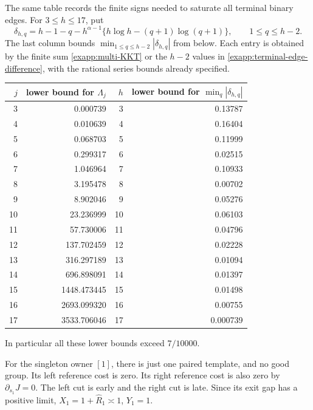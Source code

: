 The same table records the finite signs needed to saturate all
terminal binary edges.  For \(3\le h\le17\), put
\begin{equation}
 \delta_{h,q}=h-1-q-
 h^{\alpha-1}\{h\log h-(q+1)\log(q+1)\},
 \qquad 1\le q\le h-2.
 \label{exapp:terminal-edge-difference}
\end{equation}
The last column bounds \(\min_{1\le q\le h-2}|\delta_{h,q}|\)
from below.  Each entry is obtained by the finite sum
\eqref{exapp:multi-KKT} or the \(h-2\) values in
\eqref{exapp:terminal-edge-difference}, with the rational series
bounds already specified.
\begin{center}
\begin{tabular}{rr|rr}
\(j\)&lower bound for \(\Lambda_j\)&\(h\)&lower bound for
\(\min_q|\delta_{h,q}|\)\\ \hline
3&0.000739&3&0.13787\\
4&0.010639&4&0.16404\\
5&0.068703&5&0.11999\\
6&0.299317&6&0.02515\\
7&1.046964&7&0.10933\\
8&3.195478&8&0.00702\\
9&8.902046&9&0.05276\\
10&23.236999&10&0.06103\\
11&57.730006&11&0.04796\\
12&137.702459&12&0.02228\\
13&316.297189&13&0.01094\\
14&696.898091&14&0.01397\\
15&1448.473445&15&0.01498\\
16&2693.099320&16&0.00755\\
17&3533.706046&17&0.000739
\end{tabular}
\end{center}
In particular all these lower bounds exceed \(7/10000\).

For the singleton owner \([1]\), there is just one paired template,
and no good group.  Its left reference cost is zero.  Its right
reference cost is also zero by \(\partial_{s_1}J=0\).
The left cut is early and the right cut is late.  Since its exit gap
has a positive limit,
\(X_1=1+\widehat R_1\asymp1\), \(Y_1=1\).


